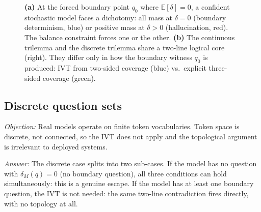 \documentclass[10pt]{article}
\begin{document}
\begin{figure}[t]
\vspace{2pt}
\caption{\textbf{(a)} At the forced boundary point $q_0$ where
$\mathbb{E}[\delta]=0$, a confident stochastic model faces a dichotomy:
all mass at $\delta=0$ (boundary determinism, blue) or positive mass at
$\delta>0$ (hallucination, red).
The balance constraint forces one or the other.
\textbf{(b)} The continuous trilemma and the discrete trilemma share a
two-line logical core (right). They differ only in how the boundary
witness $q_0$ is produced: IVT from two-sided coverage (blue) vs.\
explicit three-sided coverage (green).}
\label{fig:extensions}
\end{figure}

\subsection{Discrete question sets}
\label{sec:discrete}

\textit{Objection:} Real models operate on finite token vocabularies.
Token space is discrete, not connected, so the IVT does not apply and
the topological argument is irrelevant to deployed systems.

\textit{Answer:} The discrete case splits into two sub-cases. If the model
has no question with $\delta_M(q) = 0$ (no boundary question), all three
conditions can hold simultaneously: this is a genuine escape. If the
model has at least one boundary question, the IVT is not needed: the
same two-line contradiction fires directly, with no topology at all.
\end{document}
